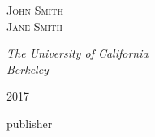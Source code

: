 \begin{titlepage}
	{\scshape\Large John Smith \\ Jane Smith \\} %

	\vspace{0.5\baselineskip} %

	\textit{The University of California \\ Berkeley} %

	\vfill %


	\plogo %

	\vspace{0.3\baselineskip} %

	2017 %

	{\large publisher} %

\end{titlepage}
